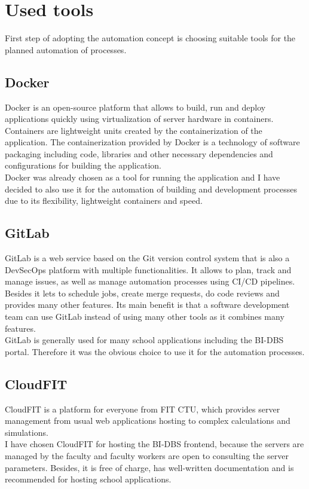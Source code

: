 \section{Used tools}\label{sec51} First step of adopting the automation concept is choosing suitable tools for the planned automation of processes.


\subsection{Docker} Docker is an open-source platform that allows to build, run and deploy applications quickly using virtualization of server hardware in containers. Containers are lightweight units created by the containerization of the application. The containerization provided by Docker is a technology of software packaging including code, libraries and other necessary dependencies and configurations for building the application.\\
Docker was already chosen as a tool for running the application and I have decided to also use it for the automation of building and development processes due to its flexibility, lightweight containers and speed. \cite{docker, docker-2}

\subsection{GitLab} GitLab is a web service based on the Git version control system that is also a DevSecOps \cite{devsecops} platform with multiple functionalities. It allows to plan, track and manage issues, as well as manage automation processes using CI/CD pipelines. Besides it lets to schedule jobs, create merge requests, do code reviews and provides many other features. Its main benefit is that a software development team can use GitLab instead of using many other tools as it combines many features. \cite{gitlab, gitlab-2}\\
GitLab is generally used for many school applications including the BI-DBS portal. Therefore it was the obvious choice to use it for the automation processes. 



\subsection{CloudFIT} CloudFIT is a platform for everyone from FIT CTU, which provides server management from usual web applications hosting to complex calculations and simulations. \cite{cloudfit}\\
I have chosen CloudFIT for hosting the BI-DBS frontend, because the servers are managed by the faculty and faculty workers are open to consulting the server parameters. Besides, it is free of charge, has well-written documentation and is recommended for hosting school applications.

